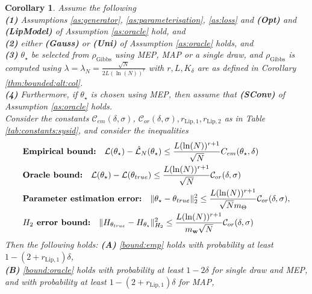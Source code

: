 \documentclass{article}
\def\rvw{{\mathbf{w}}}
\newtheorem{corollary}[theorem]{Corollary}
\begin{document}
\begin{corollary}
\label{lem:bound:mean}
Assume the following
\\
\textbf{(1)} Assumptions \ref{as:generator}, \ref{as:parameterisation}, \ref{as:loss} and  \textbf{(Opt)} and \textbf{(LipModel)} of Assumption \ref{as:oracle}  hold, and
\\
\textbf{(2)}
either \textbf{(Gauss)} or \textbf{(Uni)} of Assumption \ref{as:oracle} holds, and \\
\textbf{(3)}
  $\theta_{\star}$ be selected from $\rho_{\mathrm{Gibbs}}$ using MEP, MAP or a single draw,
and $\rho_{\mathrm{Gibbs}}$ is computed using $\lambda=\lambda_N = \frac{\sqrt{N}}{2L(\ln(N))^r}$
with $r,L,K_{\delta}$ are as defined in Corollary \ref{thm:bounded:alt:col}.\\
\textbf{(4)}
Furthermore, if $\theta_{\star}$ is chosen using MEP, then assume that \textbf{(SConv)} of Assumption \ref{as:oracle} holds. \\
Consider the constants $\mathcal{C}_{em}(\delta,\sigma)$,
$\mathcal{C}_{or}(\delta,\sigma),r_{\text{Lip},1},r_{\text{Lip},2}$ as in Table \ref{tab:constants:sysid}, and consider the 
inequalities
\begin{align}
& \textbf{Empirical bound:} \quad    \mathcal{L}(\theta_{\star}) - \hat{\mathcal{L}}_N(\theta_{\star})  \le  \frac{L(\ln(N))^{r+1}}{\sqrt{N}} C_{em}(\theta_{\star},\delta) 
  \label{bound:emp} \\
  & \textbf{Oracle bound:} \quad \mathcal{L}(\theta_{\star})  - \mathcal{L}(\theta_{true})  \le
     \frac{L(\ln(N))^{r+1}}{\sqrt{N}} \mathcal{C}_{or}(\delta,\sigma) 
     \label{bound:oracle} \\
  & \textbf{Parameter estimation error:} \quad \|\theta_{\star}-\theta_{true}\|^2_2  \le
    \frac{L(\ln(N))^{r+1}}{\sqrt{N}m_{\Theta}}
    \mathcal{C}_{or}(\delta,\sigma), 
  \label{cor:param:est1:eq1}  \\
  & \text{\textbf{$H_2$ error bound:}} \quad 
    \|H_{\theta_{true}}-H_{\theta_{\star}}\|_{H_2}^2 \le 
     \frac{L(\ln(N))^{r+1}}{m_{\rvw} \sqrt{N}} \mathcal{C}_{or}(\delta,\sigma)
   \label{col1:eq1}
\end{align}
Then the following holds: \textbf{(A)} \eqref{bound:emp} holds
with probability at least $1-(2+r_{\text{Lip},1})\delta$,  \\
\textbf{(B)} \eqref{bound:oracle} holds with probability at least $1-2\delta$ for single draw and MEP, and with probability at least $1-(2+r_{\text{Lip},1})\delta$ for MAP, \\

\end{corollary}
\end{document}
